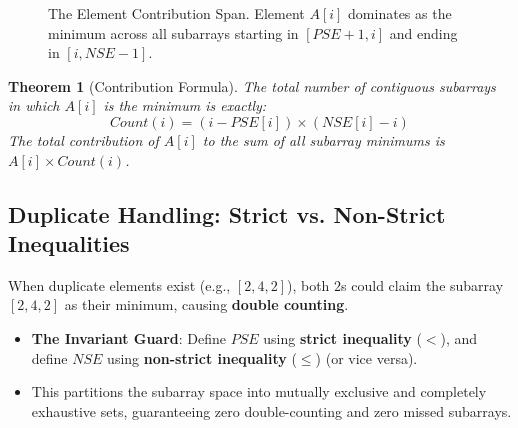 \documentclass[10pt,journal,compsoc,onecolumn]{IEEEtran}
\newtheorem{theorem}{Theorem}
\begin{document}
\begin{figure}[htbp]
\centering
{}
\caption{The Element Contribution Span. Element $A[i]$ dominates as the minimum across all subarrays starting in $[PSE+1, i]$ and ending in $[i, NSE-1]$.}
\label{fig:element_contribution}
\end{figure}

\begin{theorem}[Contribution Formula]
The total number of contiguous subarrays in which $A[i]$ is the minimum is exactly:
\begin{equation}
Count(i) = (i - PSE[i]) \times (NSE[i] - i)
\end{equation}
The total contribution of $A[i]$ to the sum of all subarray minimums is $A[i] \times Count(i)$.
\end{theorem}

\subsection{Duplicate Handling: Strict vs. Non-Strict Inequalities}
When duplicate elements exist (e.g., $[2, 4, 2]$), both $2$s could claim the subarray $[2, 4, 2]$ as their minimum, causing \textbf{double counting}.
\begin{itemize}
    \item \textbf{The Invariant Guard}: Define $PSE$ using \textbf{strict inequality} ($<$), and define $NSE$ using \textbf{non-strict inequality} ($\le$) (or vice versa).
    \item This partitions the subarray space into mutually exclusive and completely exhaustive sets, guaranteeing zero double-counting and zero missed subarrays.
\end{itemize}
\end{document}
